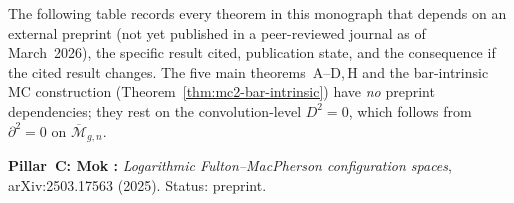 \begin{remark}
\label{rem:preprint-dependency-table}
The following table records every theorem in this monograph that
depends on an external preprint (not yet published in a
peer-reviewed journal as of March~2026), the specific result
cited, publication state, and the consequence if the cited result
changes. The five main theorems~A--D,\,H and
the bar-intrinsic MC construction
(Theorem~\ref{thm:mc2-bar-intrinsic}) have \emph{no} preprint
dependencies; they rest on the convolution-level $D^2 = 0$,
which follows from $\partial^2 = 0$ on
$\overline{\mathcal{M}}_{g,n}$.

\medskip
\noindent\textbf{Pillar~C: Mok \cite{Mok25}:}
\emph{Logarithmic Fulton--MacPherson configuration spaces},
arXiv:2503.17563 (2025). Status: preprint.


\end{remark}

